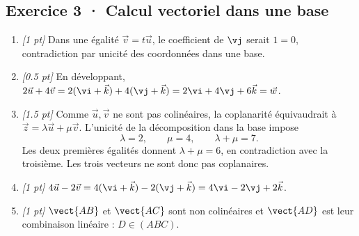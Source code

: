 \subsection*{Exercice 3 · Calcul vectoriel dans une base}\begin{enumerate}

\item \textit{[1 pt]} Dans une égalité $\vec v=t\vec u$, le coefficient de $\vj $ serait $1=0$, contradiction par unicité des coordonnées dans une base.

\item \textit{[\num{0,5} pt]} En développant, $2\vec u+4\vec v=2(\vi +\vec k)+4(\vj +\vec k)=2\vi +4\vj +6\vec k=\vec w$.

\item \textit{[\num{1,5} pt]} Comme $\vec u,\vec v$ ne sont pas colinéaires, la coplanarité équivaudrait à $\vec z=\lambda\vec u+\mu\vec v$. L'unicité de la décomposition dans la base impose
\[\lambda=2,\qquad\mu=4,\qquad\lambda+\mu=7.\]
Les deux premières égalités donnent $\lambda+\mu=6$, en contradiction avec la troisième. Les trois vecteurs ne sont donc pas coplanaires.

\item \textit{[1 pt]} $4\vec u-2\vec v=4(\vi +\vec k)-2(\vj +\vec k)=4\vi -2\vj +2\vec k$.

\item \textit{[1 pt]} $\vect{AB}$ et $\vect{AC}$ sont non colinéaires et $\vect{AD}$ est leur combinaison linéaire : $D\in(ABC)$.

\end{enumerate}


